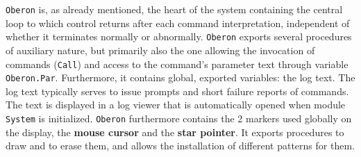 \verb|Oberon| is, as already mentioned, the heart of the system containing the central loop
to which control returns after each command interpretation, independent of whether it
terminates normally or abnormally. \verb|Oberon| exports several procedures of auxiliary
nature, but primarily also the one allowing the invocation of commands (\verb|Call|) and
access to the command's parameter text through variable \verb|Oberon.Par|. Furthermore, it
contains global, exported variables: the log text. The log text typically serves to issue
prompts and short failure reports of commands. The text is displayed in a log viewer that
is automatically opened when module \verb|System| is initialized. \verb|Oberon| furthermore
contains the 2 markers used globally on the display, the \textbf{mouse cursor} and the
\textbf{star pointer}. It exports procedures to draw and to erase them, and allows the
installation of different patterns for them.

